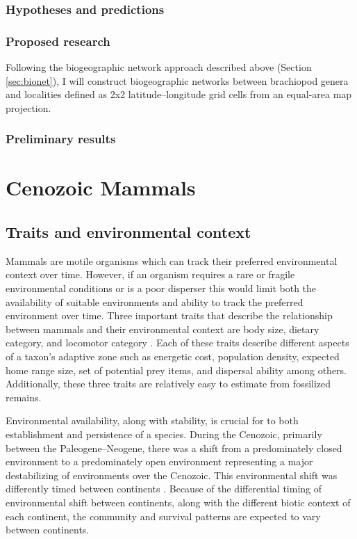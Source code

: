 \documentclass[12pt,letterpaper]{article}
\begin{document}
\subsubsection{Hypotheses and predictions} \label{sec:braccompred}




\subsubsection{Proposed research} \label{sec:braccommeth}
Following the biogeographic network approach described above (Section \ref{sec:bionet}), I will construct biogeographic networks between brachiopod genera and localities defined as 2x2 latitude--longitude grid cells from an equal-area map projection.

\subsubsection{Preliminary results} \label{sec:braccomres}


\clearpage

\section{Cenozoic Mammals} \label{sec:mam}
\subsection{Traits and environmental context} \label{sec:mamback}
Mammals are motile organisms which can track their preferred environmental context over time. However, if an organism requires a rare or fragile environmental conditions or is a poor disperser this would limit both the availability of suitable environments and ability to track the preferred environment over time. Three important traits that describe the relationship between mammals and their environmental context are body size, dietary category, and locomotor category \citep{Smith2004,Smith2008b,Damuth1981a,Damuth1979,Jernvall2004,Lyons2005,Lyons2010}. Each of these traits describe different aspects of a taxon's adaptive zone such as energetic cost, population density, expected home range size, set of potential prey items, and dispersal ability among others. Additionally, these three traits are relatively easy to estimate from fossilized remains. 

Environmental availability, along with stability, is crucial for to both establishment and persistence of a species. During the Cenozoic, primarily between the Paleogene--Neogene, there was a shift from a predominately closed environment to a predominately open environment \citep{Janis1993a,Blois2009,Rose2006} representing a major destabilizing of environments over the Cenozoic. This environmental shift was differently timed between continents \citep{Stromberg2005,Stromberg2013}. Because of the differential timing of environmental shift between continents, along with the different biotic context of each continent, the community and survival patterns are expected to vary between continents.
\end{document}
